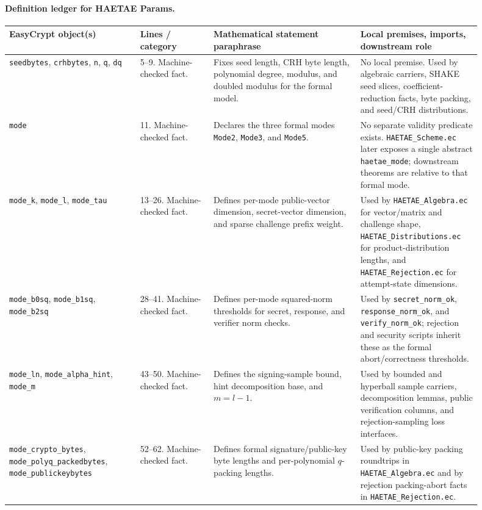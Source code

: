 \documentclass[11pt]{report}
\DeclareRobustCommand{\file}[1]{\ifmmode\text{\nolinkurl{#1}}\else\nolinkurl{#1}\fi}
\DeclareRobustCommand{\ec}[1]{\ifmmode\text{\nolinkurl{#1}}\else\nolinkurl{#1}\fi}
\theoremstyle{definition}
\theoremstyle{plain}
\begin{document}
\paragraph{Definition ledger for HAETAE Params.}
{\footnotesize
\begin{longtable}{p{0.25\linewidth}p{0.14\linewidth}p{0.28\linewidth}p{0.23\linewidth}}
\toprule
\textbf{EasyCrypt object(s)} & \textbf{Lines / category} &
\textbf{Mathematical statement paraphrase} &
\textbf{Local premises, imports, downstream role} \\
\midrule
\ec{seedbytes}, \ec{crhbytes}, \ec{n}, \ec{q}, \ec{dq} &
5--9. Machine-checked fact. &
Fixes seed length, CRH byte length, polynomial degree, modulus, and doubled
modulus for the formal model. &
No local premise.  Used by algebraic carriers, SHAKE seed slices,
coefficient-reduction facts, byte packing, and seed/CRH distributions. \\
\midrule
\ec{mode} &
11. Machine-checked fact. &
Declares the three formal modes \ec{Mode2}, \ec{Mode3}, and \ec{Mode5}. &
No separate validity predicate exists.  \file{HAETAE\_Scheme.ec} later exposes
a single abstract \ec{haetae\_mode}; downstream theorems are relative to that
formal mode. \\
\midrule
\ec{mode\_k}, \ec{mode\_l}, \ec{mode\_tau} &
13--26. Machine-checked fact. &
Defines per-mode public-vector dimension, secret-vector dimension, and sparse
challenge prefix weight. &
Used by \file{HAETAE\_Algebra.ec} for vector/matrix and challenge shape,
\file{HAETAE\_Distributions.ec} for product-distribution lengths, and
\file{HAETAE\_Rejection.ec} for attempt-state dimensions. \\
\midrule
\ec{mode\_b0sq}, \ec{mode\_b1sq}, \ec{mode\_b2sq} &
28--41. Machine-checked fact. &
Defines per-mode squared-norm thresholds for secret, response, and verifier
norm checks. &
Used by \ec{secret\_norm\_ok}, \ec{response\_norm\_ok}, and
\ec{verify\_norm\_ok}; rejection and security scripts inherit these as the
formal abort/correctness thresholds. \\
\midrule
\ec{mode\_ln}, \ec{mode\_alpha\_hint}, \ec{mode\_m} &
43--50. Machine-checked fact. &
Defines the signing-sample bound, hint decomposition base, and \(m=l-1\). &
Used by bounded and hyperball sample carriers, decomposition lemmas, public
verification columns, and rejection-sampling loss interfaces. \\
\midrule
\ec{mode\_crypto\_bytes}, \ec{mode\_polyq\_packedbytes},
\ec{mode\_publickeybytes} &
52--62. Machine-checked fact. &
Defines formal signature/public-key byte lengths and per-polynomial
\(q\)-packing lengths. &
Used by public-key packing roundtrips in \file{HAETAE\_Algebra.ec} and by
rejection packing-abort facts in \file{HAETAE\_Rejection.ec}. \\
\bottomrule
\end{longtable}
}
\end{document}
